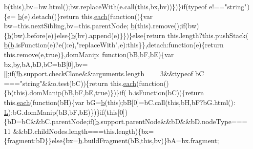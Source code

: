 \begin{DoxyCode}
      \hyperlink{a00039_aa4026ad5544b958e54ce5e106fa1c805}{b}(\textcolor{keyword}{this}),bv=bw.html();bw.replaceWith(e.call(\textcolor{keyword}{this},bx,bv))\})\}\textcolor{keywordflow}{if}(typeof e!==\textcolor{stringliteral}{"string"})\{e=
      \hyperlink{a00039_aa4026ad5544b958e54ce5e106fa1c805}{b}(e).detach()\}\textcolor{keywordflow}{return} this.\hyperlink{a00039_a871ff39db627c54c710a3e9909b8234c}{each}(\textcolor{keyword}{function}()\{var bw=this.nextSibling,bv=this.parentNode;
      \hyperlink{a00039_aa4026ad5544b958e54ce5e106fa1c805}{b}(\textcolor{keyword}{this}).remove();\textcolor{keywordflow}{if}(bw)\{\hyperlink{a00039_aa4026ad5544b958e54ce5e106fa1c805}{b}(bw).before(e)\}\textcolor{keywordflow}{else}\{\hyperlink{a00039_aa4026ad5544b958e54ce5e106fa1c805}{b}(bv).append(e)\}\})\}\textcolor{keywordflow}{else}\{\textcolor{keywordflow}{return} this.length?this.pushStack(
      \hyperlink{a00039_aa4026ad5544b958e54ce5e106fa1c805}{b}(\hyperlink{a00039_aa4026ad5544b958e54ce5e106fa1c805}{b}.isFunction(e)?e():e),\textcolor{stringliteral}{"replaceWith"},e):this\}\},detach:function(e)\{\textcolor{keywordflow}{return} this.\textcolor{keyword}{remove}(e,\textcolor{keyword}{true})\},domManip:\textcolor{keyword}{
      function}(bB,bF,bE)\{var bx,by,bA,bD,bC=bB[0],bv=[];\textcolor{keywordflow}{if}(!\hyperlink{a00039_aa4026ad5544b958e54ce5e106fa1c805}{b}.support.checkClone&&arguments.length===3&&typeof bC
      ===\textcolor{stringliteral}{"string"}&&o.test(bC))\{\textcolor{keywordflow}{return} this.\hyperlink{a00039_a871ff39db627c54c710a3e9909b8234c}{each}(\textcolor{keyword}{function}()\{\hyperlink{a00039_aa4026ad5544b958e54ce5e106fa1c805}{b}(\textcolor{keyword}{this}).domManip(bB,bF,bE,\textcolor{keyword}{true})\})\}\textcolor{keywordflow}{if}(
      \hyperlink{a00039_aa4026ad5544b958e54ce5e106fa1c805}{b}.isFunction(bC))\{\textcolor{keywordflow}{return} this.\hyperlink{a00039_a871ff39db627c54c710a3e9909b8234c}{each}(\textcolor{keyword}{function}(bH)\{var bG=\hyperlink{a00039_aa4026ad5544b958e54ce5e106fa1c805}{b}(\textcolor{keyword}{this});bB[0]=bC.call(\textcolor{keyword}{this},bH,bF?bG.html():
      \hyperlink{a00039_a38ee4c0b5f4fe2a18d0c783af540d253}{L});bG.domManip(bB,bF,bE)\})\}\textcolor{keywordflow}{if}(\textcolor{keyword}{this}[0])\{bD=bC&&bC.parentNode;\textcolor{keywordflow}{if}(\hyperlink{a00039_aa4026ad5544b958e54ce5e106fa1c805}{b}.support.parentNode&&bD&&bD.nodeType===11
      &&bD.childNodes.length===\textcolor{keyword}{this}.length)\{bx=\{fragment:bD\}\}\textcolor{keywordflow}{else}\{bx=\hyperlink{a00039_aa4026ad5544b958e54ce5e106fa1c805}{b}.buildFragment(bB,\textcolor{keyword}{this},bv)\}bA=bx.fragment;\textcolor{keywordflow}{
}
\end{DoxyCode}
